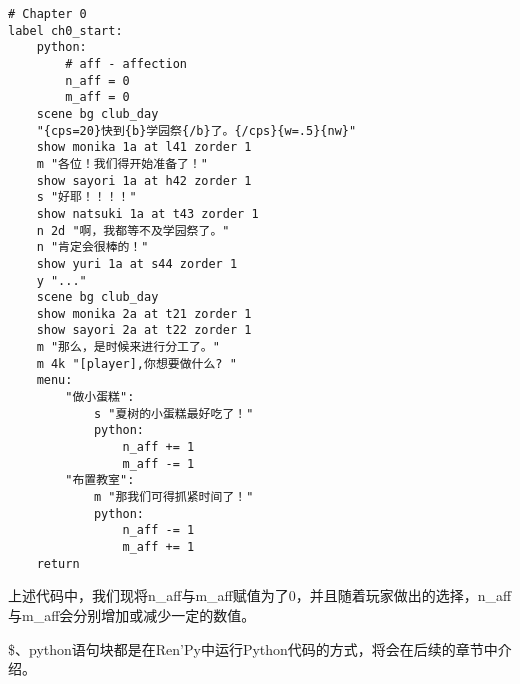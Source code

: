 \begin{lstlisting}[caption=script-ch1.rpy]
# Chapter 0
label ch0_start:
    python:
        # aff - affection
        n_aff = 0
        m_aff = 0
    scene bg club_day
    "{cps=20}快到{b}学园祭{/b}了。{/cps}{w=.5}{nw}"
    show monika 1a at l41 zorder 1
    m "各位！我们得开始准备了！"
    show sayori 1a at h42 zorder 1
    s "好耶！！！！"
    show natsuki 1a at t43 zorder 1
    n 2d "啊，我都等不及学园祭了。"
    n "肯定会很棒的！"
    show yuri 1a at s44 zorder 1
    y "..."
    scene bg club_day
    show monika 2a at t21 zorder 1
    show sayori 2a at t22 zorder 1
    m "那么，是时候来进行分工了。"
    m 4k "[player],你想要做什么? "
    menu:
        "做小蛋糕":
            s "夏树的小蛋糕最好吃了！"
            python:
                n_aff += 1
                m_aff -= 1
        "布置教室":
            m "那我们可得抓紧时间了！"
            python:
                n_aff -= 1
                m_aff += 1
    return
\end{lstlisting}

上述代码中，我们现将n\_aff与m\_aff赋值为了0，并且随着玩家做出的选择，n\_aff与m\_aff会分别增加或减少一定的数值。

\begin{ExtraKnowledge}
    \$、python语句块都是在Ren'Py中运行Python代码的方式，将会在后续的章节中介绍。
\end{ExtraKnowledge}